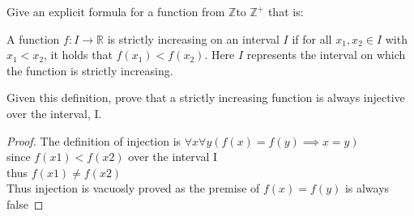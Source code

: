 \documentclass[a4paper]{exam}
\theoremstyle{definition}
\newcommand\Z{\ensuremath{\mathbb{Z}}}
\newcommand\R{\ensuremath{\mathbb{R}}}
\begin{document}
\begin{questions}
\question Give an explicit formula for a function from \Z to $\Z^+$ that is:

\question A function \(f: I \rightarrow \R\) is strictly increasing on an interval \(I\) if for all \(x_1, x_2 \in I\) with \(x_1 < x_2\), it holds that \(f(x_1) < f(x_2)\). Here $I$ represents the interval on which the function is strictly increasing.
  
  Given this definition, prove that a strictly increasing function is always injective over the interval, I.

  \begin{solution}
    \begin{proof}
    The definition of injection is $\forall x \forall y (f(x) = f(y) \implies x = y)$\\
    since $f(x1) < f(x2)$ over the interval I\\
    thus $f(x1) \neq f(x2)$\\
    Thus injection is vacuosly proved as the premise of $f(x) = f(y)$ is always false 
    \end{proof}
  \end{solution}
\end{questions}
\end{document}
